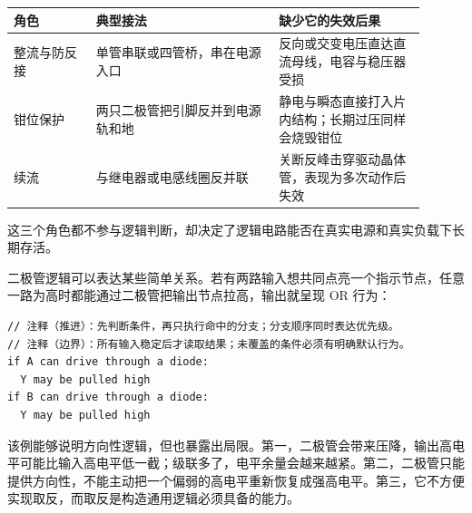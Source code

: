 \begin{longtable}{L{0.18\linewidth}L{0.4\linewidth}L{0.32\linewidth}}
\toprule
角色 & 典型接法 & 缺少它的失效后果 \\
\midrule
整流与防反接 & 单管串联或四管桥，串在电源入口 & 反向或交变电压直达直流母线，电容与稳压器受损 \\\tablerowrule
钳位保护 & 两只二极管把引脚反并到电源轨和地 & 静电与瞬态直接打入片内结构；长期过压同样会烧毁钳位 \\\tablerowrule
续流 & 与继电器或电感线圈反并联 & 关断反峰击穿驱动晶体管，表现为多次动作后失效 \\
\bottomrule
\end{longtable}

这三个角色都不参与逻辑判断，却决定了逻辑电路能否在真实电源和真实负载下长期存活。

二极管逻辑可以表达某些简单关系。若有两路输入想共同点亮一个指示节点，任意一路为高时都能通过二极管把输出节点拉高，输出就呈现 OR 行为：

\begin{lstlisting}
// 注释（推进）：先判断条件，再只执行命中的分支；分支顺序同时表达优先级。
// 注释（边界）：所有输入稳定后才读取结果；未覆盖的条件必须有明确默认行为。
if A can drive through a diode:
  Y may be pulled high
if B can drive through a diode:
  Y may be pulled high
\end{lstlisting}

该例能够说明方向性逻辑，但也暴露出局限。第一，二极管会带来压降，输出高电平可能比输入高电平低一截；级联多了，电平余量会越来越紧。第二，二极管只能提供方向性，不能主动把一个偏弱的高电平重新恢复成强高电平。第三，它不方便实现取反，而取反是构造通用逻辑必须具备的能力。

